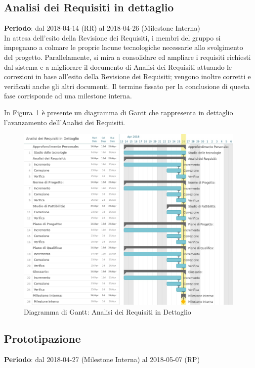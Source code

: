 \subsection{Analisi dei Requisiti in dettaglio}
\textbf{Periodo}: dal 2018-04-14 (RR) al 2018-04-26 (Milestone Interna)\\

In attesa dell'esito della Revisione dei Requisiti, i membri del gruppo si impegnano a colmare le proprie lacune tecnologiche necessarie allo svolgimento del progetto. Parallelamente, si mira a consolidare ed ampliare i requisiti richiesti dal sistema e a migliorare il documento di Analisi dei Requisiti attuando le correzioni in base all’esito della Revisione dei Requisiti; vengono inoltre corretti e verificati anche gli altri documenti. Il termine fissato per la conclusione di questa fase corrisponde ad una milestone interna.

In Figura~\ref{fig:gantt_ana_req_dett} è presente un diagramma di Gantt che rappresenta in dettaglio l'avanzamento dell'Analisi dei Requisiti. 

\begin{figure}[h!]
	\centerline{\includegraphics[scale=0.5]{img/DiagrammiGantt/AnalisiRequisitiDettaglio.jpg}}
	\caption{Diagramma di Gantt: Analisi dei Requisiti in Dettaglio}
	\label{fig:gantt_ana_req_dett}
\end{figure}
\clearpage

\subsection{Prototipazione}
\textbf{Periodo}: dal 2018-04-27 (Milestone Interna) al 2018-05-07 (RP)\\

